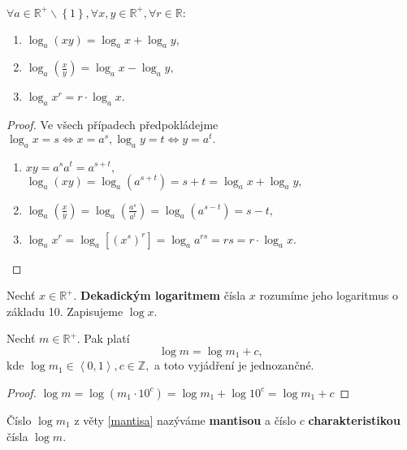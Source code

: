 \begin{veta}
    $\forall a \in \mathbb R^+ \smallsetminus \left \{ 1 \right \}, \forall x,y \in \mathbb R^+
    ,\forall r \in \mathbb R:$
    \begin{enumerate}[$i.$]
        \item $\log_a (xy)=\log_a x + \log_a y,$
       	\item $\log_a \left ( \frac{x}{y} \right ) = \log_a x - \log_a y,$
       	\item $\log_a x^r = r\cdot \log_a x.$
    \end{enumerate}
\end{veta}

\begin{proof}
    Ve všech případech předpokládejme $\log_a x = s \iff x = a^s,
    \log_a y = t \iff y = a^t.$
    \begin{enumerate}[$i.$]
        \item $xy = a^sa^t=a^{s+t},$\\
        $\log_a (xy) = \log_a (a^{s+t}) = s+t=\log_a x + \log_a y,$
       	\item $\log_a \left ( \frac{x}{y} \right )  = \log_a
        \left ( \frac{a^s}{a^t} \right ) =\log_a \left ( a^{s-t} \right ) =
        s-t,$
       	\item $\log_a x^r = \log_a \left [ \left ( x^s \right )^r  \right ] =
        \log_a a^{rs}=rs=r\cdot \log_a x.$\qedhere
    \end{enumerate}
\end{proof}

\begin{definition}
    Nechť $x\in \mathbb R^+.$ \textbf{Dekadickým logaritmem} čísla $x$ rozumíme
    jeho logaritmus o základu 10. Zapisujeme $\log x.$
\end{definition}

\begin{veta}\label{mantisa}
    Nechť $m\in \mathbb R^+.$ Pak platí
    $$\log m = \log m_1 + c,$$
    kde $\log m_1 \in \left < 0,1 \right >, c \in \mathbb Z,$ a toto vyjádření
    je jednozančné.
\end{veta}

\begin{proof}
    $\log m = \log \left ( m_1\cdot 10^c \right ) = \log m_1 + \log 10^c
    = \log m_1 + c$
\end{proof}

\begin{definition}
    Číslo $\log m_1$ z věty \ref{mantisa} nazýváme \textbf{mantisou} a číslo
    $c$ \textbf{charakteristikou} čísla $\log m.$
\end{definition}

